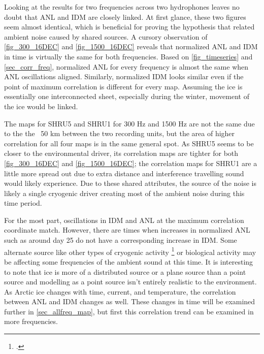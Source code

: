 Looking at the results for two frequencies across two hydrophones leaves no doubt that ANL and IDM are closely linked. At first glance, these two figures seem almost identical, which is beneficial for proving the hypothesis that related ambient noise caused by shared sources. A cursory observation of \autoref{fig_300_16DEC} and \autoref{fig_1500_16DEC} reveals that normalized ANL and IDM in time is virtually the same for both frequencies. Based on \autoref{fig_timeseries} and \autoref{sec_corr_freq}, normalized ANL for every frequency is almost the same when ANL oscillations aligned. Similarly, normalized IDM looks similar even if the point of maximum correlation is different for every map. Assuming the ice is essentially one interconnected sheet, especially during the winter, movement of the ice would be linked.  


The maps for SHRU5 and SHRU1 for 300 Hz and 1500 Hz are not the same due to the the ~50 km between the two recording units, but the area of higher correlation for all four maps is in the same general spot. As SHRU5 seems to be closer to the environmental driver, its correlation maps are tighter for both \autoref{fig_300_16DEC} and \autoref{fig_1500_16DEC}; the correlation maps for SHRU1 are a little more spread out due to extra distance and interference travelling sound would likely experience. Due to these shared attributes, the source of the noise is likely a single cryogenic driver creating most of the ambient noise during this time period. 

For the most part, oscillations in IDM and ANL at the maximum correlation coordinate match. However, there are times when increases in normalized ANL such as around day 25 do not have a corresponding increase in IDM. Some alternate source like other types of cryogenic activity \footcite[]{collins2019acoustic} or biological activity may be affecting some frequencies of the ambient sound at this time. It is interesting to note that ice is more of a distributed source or a plane source than a point source and modelling as a point source isn't entirely realistic to the environment. As Arctic ice changes with time, current, and temperature, the correlation between ANL and IDM changes as well. These changes in time will be examined further in \autoref{sec_allfreq_map}, but first this correlation trend can be examined in more frequencies.


